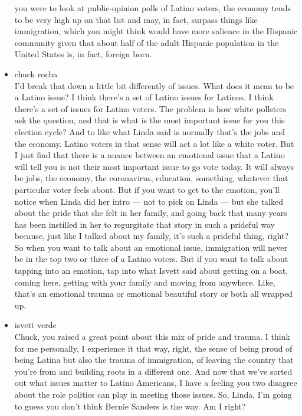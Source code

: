 \begin{itemize}
  you were to look at public-opinion polls of Latino voters, the economy
  tends to be very high up on that list and may, in fact, surpass things
  like immigration, which you might think would have more salience in
  the Hispanic community given that about half of the adult Hispanic
  population in the United States is, in fact, foreign born.
\item
  chuck rocha\\
  I'd break that down a little bit differently of issues. What does it
  mean to be a Latino issue? I think there's a set of Latino issues for
  Latinos. I think there's a set of issues for Latino voters. The
  problem is how white pollsters ask the question, and that is what is
  the most important issue for you this election cycle? And to like what
  Linda said is normally that's the jobs and the economy. Latino voters
  in that sense will act a lot like a white voter. But I just find that
  there is a nuance between an emotional issue that a Latino will tell
  you is not their most important issue to go vote today. It will always
  be jobs, the economy, the coronavirus, education, something, whatever
  that particular voter feels about. But if you want to get to the
  emotion, you'll notice when Linda did her intro --- not to pick on
  Linda --- but she talked about the pride that she felt in her family,
  and going back that many years has been instilled in her to
  regurgitate that story in such a prideful way because, just like I
  talked about my family, it's such a prideful thing, right? So when you
  want to talk about an emotional issue, immigration will never be in
  the top two or three of a Latino voters. But if you want to talk about
  tapping into an emotion, tap into what Isvett said about getting on a
  boat, coming here, getting with your family and moving from anywhere.
  Like, that's an emotional trauma or emotional beautiful story or both
  all wrapped up.
\item
  isvett verde\\
  Chuck, you raised a great point about this mix of pride and trauma. I
  think for me personally, I experience it that way, right, the sense of
  being proud of being Latina but also the trauma of immigration, of
  leaving the country that you're from and building roots in a different
  one. And now that we've sorted out what issues matter to Latino
  Americans, I have a feeling you two disagree about the role politics
  can play in meeting those issues. So, Linda, I'm going to guess you
  don't think Bernie Sanders is the way. Am I right?

\end{itemize}
